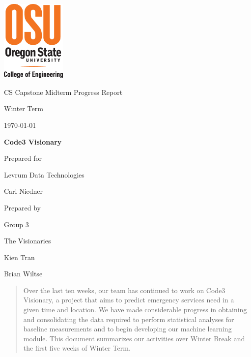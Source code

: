 \documentclass[onecolumn, draftclsnofoot,10pt, compsoc]{IEEEtran}
\def \CapstoneTeamName{   The Visionaries}
\def \CapstoneTeamNumber{   3}
\def \GroupMemberOne{     Kien Tran}
\def \GroupMemberTwo{       Brian Wiltse}
\def \CapstoneProjectName{    Code3 Visionary}
\def \CapstoneSponsorCompany{ Levrum Data Technologies}
\def \CapstoneSponsorPerson{  Carl Niedner}
\def \DocType{    
        Midterm Progress Report
        }
\newcommand{\NameSigPair}[1]{\par
\makebox[2.75in][r]{#1} \hfil   \makebox[3.25in]{\makebox[2.25in]{\hrulefill} \hfill    \makebox[.75in]{\hrulefill}}
\par\vspace{-12pt} \textit{\tiny\noindent
\makebox[2.75in]{} \hfil    \makebox[3.25in]{\makebox[2.25in][r]{Signature} \hfill  \makebox[.75in][r]{Date}}}}
\renewcommand{\NameSigPair}[1]{#1}
\begin{document}
\begin{titlepage}
    \begin{singlespace}
      \includegraphics[height=4cm]{coe_v_spot1}
        \hfill 
        \par\vspace{.2in}
        \centering
        \scshape{
            \huge CS Capstone \DocType \par
            \large{Winter Term}\par
            {\large\today}\par
            \vspace{.5in}
            \textbf{\Huge\CapstoneProjectName}\par
            \vfill
            {\large Prepared for}\par
            \Huge \CapstoneSponsorCompany\par
            \vspace{5pt}
            {\Large\NameSigPair{\CapstoneSponsorPerson}\par}
            {\large Prepared by }\par
            Group\CapstoneTeamNumber\par
            \CapstoneTeamName\par 
            \vspace{5pt}
            {\Large
                \NameSigPair{\GroupMemberOne}\par
                \NameSigPair{\GroupMemberTwo}\par
            }
            \vspace{20pt}
        }
        \begin{abstract}
                Over the last ten weeks, our team has continued to work on Code3 Visionary, a project that aims to predict emergency services need in a given time and location. 
                We have made considerable progress in obtaining and consolidating the data required to perform statistical analyses for baseline measurements and to begin developing our machine learning module.
                This document summarizes our activities over Winter Break and the first five weeks of Winter Term.
        \end{abstract}
    \end{singlespace}
\end{titlepage}
\newpage
{}
\tableofcontents
\listoffigures
\clearpage
\end{document}
